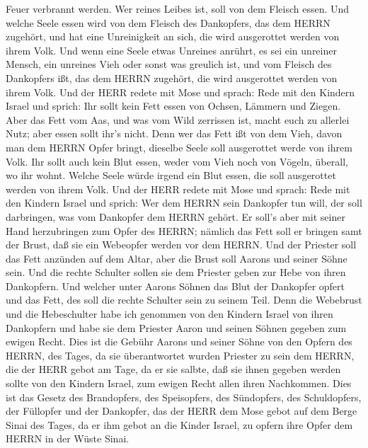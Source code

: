 Feuer verbrannt werden. Wer reines Leibes ist, soll von dem Fleisch
essen.  Und welche Seele essen wird von dem Fleisch des
Dankopfers, das dem HERRN zugehört, und hat eine Unreinigkeit an sich,
die wird ausgerottet werden von ihrem Volk.  Und wenn eine
Seele etwas Unreines anrührt, es sei ein unreiner Mensch, ein unreines
Vieh oder sonst was greulich ist, und vom Fleisch des Dankopfers ißt,
das dem HERRN zugehört, die wird ausgerottet werden von ihrem Volk.
 Und der HERR redete mit Mose und sprach: 
Rede mit den Kindern Israel und sprich: Ihr sollt kein Fett essen von
Ochsen, Lämmern und Ziegen.  Aber das Fett vom Aas, und was
vom Wild zerrissen ist, macht euch zu allerlei Nutz; aber essen sollt
ihr's nicht.  Denn wer das Fett ißt von dem Vieh, davon man
dem HERRN Opfer bringt, dieselbe Seele soll ausgerottet werde von ihrem
Volk.  Ihr sollt auch kein Blut essen, weder vom Vieh noch
von Vögeln, überall, wo ihr wohnt.  Welche Seele würde
irgend ein Blut essen, die soll ausgerottet werden von ihrem Volk.
 Und der HERR redete mit Mose und sprach: 
Rede mit den Kindern Israel und sprich: Wer dem HERRN sein Dankopfer tun
will, der soll darbringen, was vom Dankopfer dem HERRN gehört.
 Er soll's aber mit seiner Hand herzubringen zum Opfer des
HERRN; nämlich das Fett soll er bringen samt der Brust, daß sie ein
Webeopfer werden vor dem HERRN.  Und der Priester soll das
Fett anzünden auf dem Altar, aber die Brust soll Aarons und seiner Söhne
sein.  Und die rechte Schulter sollen sie dem Priester
geben zur Hebe von ihren Dankopfern.  Und welcher unter
Aarons Söhnen das Blut der Dankopfer opfert und das Fett, des soll die
rechte Schulter sein zu seinem Teil.  Denn die Webebrust
und die Hebeschulter habe ich genommen von den Kindern Israel von ihren
Dankopfern und habe sie dem Priester Aaron und seinen Söhnen gegeben zum
ewigen Recht.  Dies ist die Gebühr Aarons und seiner Söhne
von den Opfern des HERRN, des Tages, da sie überantwortet wurden
Priester zu sein dem HERRN,  die der HERR gebot am Tage, da
er sie salbte, daß sie ihnen gegeben werden sollte von den Kindern
Israel, zum ewigen Recht allen ihren Nachkommen.  Dies ist
das Gesetz des Brandopfers, des Speisopfers, des Sündopfers, des
Schuldopfers, der Füllopfer und der Dankopfer,  das der
HERR dem Mose gebot auf dem Berge Sinai des Tages, da er ihm gebot an
die Kinder Israel, zu opfern ihre Opfer dem HERRN in der Wüste Sinai.

